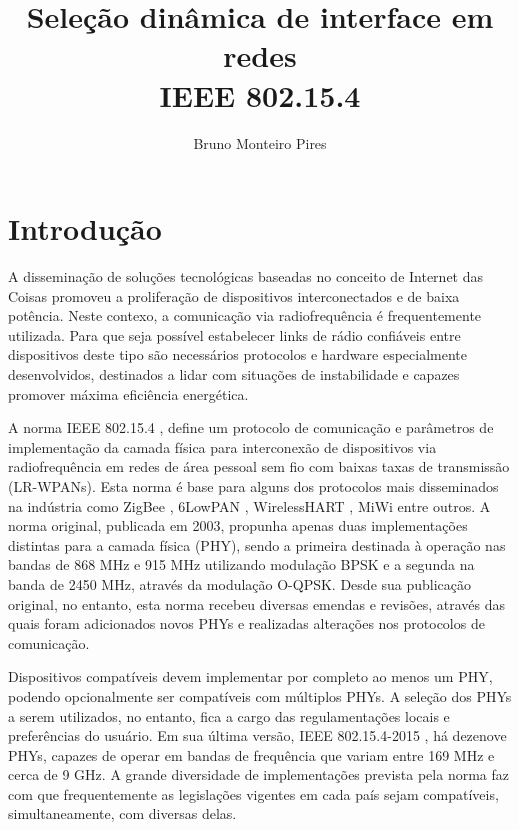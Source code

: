 \documentclass{article}
\begin{document}
\title{Seleção dinâmica de interface em redes \\ IEEE 802.15.4}
\author{Bruno Monteiro Pires}
\maketitle
\clearpage

\chapter{Introdução}
	A disseminação de soluções tecnológicas baseadas no conceito de Internet das Coisas promoveu a proliferação de dispositivos interconectados e de baixa potência. Neste contexo, a comunicação via radiofrequência é frequentemente utilizada. Para que seja possível estabelecer links de rádio confiáveis entre dispositivos deste tipo são necessários protocolos e hardware especialmente desenvolvidos, destinados a lidar com situações de instabilidade e capazes promover máxima eficiência energética.

	A norma IEEE 802.15.4 \cite{1237559}, define um protocolo de comunicação e parâmetros de implementação da camada física para interconexão de dispositivos via radiofrequência em redes de área pessoal sem fio com baixas taxas de transmissão (LR-WPANs). Esta norma é base para alguns dos protocolos mais disseminados na indústria como ZigBee \cite{bibid}, 6LowPAN \cite{bibid}, WirelessHART \cite{bibid}, MiWi \cite{bibid} entre outros. A norma original, publicada em 2003, propunha apenas duas implementações distintas para a camada física (PHY), sendo a primeira destinada à operação nas bandas de 868 MHz e 915 MHz utilizando modulação BPSK e a segunda na banda de 2450 MHz, através da modulação O-QPSK. Desde sua publicação original, no entanto, esta norma recebeu diversas emendas e revisões, através das quais foram adicionados novos PHYs e realizadas alterações nos protocolos de comunicação. 
	
	Dispositivos compatíveis devem implementar por completo ao menos um PHY, podendo opcionalmente ser compatíveis com múltiplos PHYs. A seleção dos PHYs a serem utilizados, no entanto, fica a cargo das regulamentações locais e preferências do usuário. Em sua última versão, IEEE 802.15.4-2015 \cite{7460875}, há dezenove PHYs, capazes de operar em bandas de frequência que variam entre 169 MHz e cerca de 9 GHz. A grande diversidade de  implementações prevista pela norma faz com que frequentemente as legislações vigentes em cada país sejam compatíveis, simultaneamente, com diversas delas.
	
\end{document}
